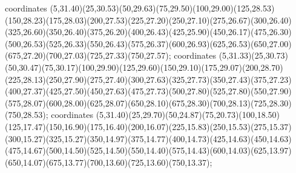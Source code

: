  coordinates {(5,31.40)(25,30.53)(50,29.63)(75,29.50)(100,29.00)(125,28.53)(150,28.23)(175,28.03)(200,27.53)(225,27.20)(250,27.10)(275,26.67)(300,26.40)(325,26.60)(350,26.40)(375,26.20)(400,26.43)(425,25.90)(450,26.17)(475,26.30)(500,26.53)(525,26.33)(550,26.43)(575,26.37)(600,26.93)(625,26.53)(650,27.00)(675,27.20)(700,27.03)(725,27.33)(750,27.57)};
 coordinates {(5,31.33)(25,30.73)(50,30.47)(75,30.17)(100,29.90)(125,29.60)(150,29.10)(175,29.07)(200,28.70)(225,28.13)(250,27.90)(275,27.40)(300,27.63)(325,27.73)(350,27.43)(375,27.23)(400,27.37)(425,27.50)(450,27.63)(475,27.73)(500,27.80)(525,27.80)(550,27.90)(575,28.07)(600,28.00)(625,28.07)(650,28.10)(675,28.30)(700,28.13)(725,28.30)(750,28.53)};
 coordinates {(5,31.40)(25,29.70)(50,24.87)(75,20.73)(100,18.50)(125,17.47)(150,16.90)(175,16.40)(200,16.07)(225,15.83)(250,15.53)(275,15.37)(300,15.27)(325,15.27)(350,14.97)(375,14.77)(400,14.73)(425,14.63)(450,14.63)(475,14.67)(500,14.50)(525,14.50)(550,14.40)(575,14.43)(600,14.03)(625,13.97)(650,14.07)(675,13.77)(700,13.60)(725,13.60)(750,13.37)};
